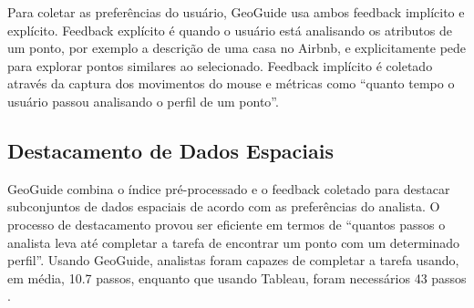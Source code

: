 Para coletar as preferências do usuário, GeoGuide usa ambos feedback implícito e explícito. Feedback explícito é quando o usuário está analisando os atributos de um ponto, por exemplo a descrição de uma casa no Airbnb, e explicitamente pede para explorar pontos similares ao selecionado. Feedback implícito é coletado através da captura dos movimentos do mouse e métricas como  ``quanto tempo o usuário passou analisando o perfil de um ponto''.

\subsection{Destacamento de Dados Espaciais}

GeoGuide combina o índice pré-processado e o feedback coletado para destacar subconjuntos de dados espaciais de acordo com as preferências do analista. O processo de destacamento provou ser eficiente em termos de ``quantos passos o analista leva até completar a tarefa de encontrar um ponto com um determinado perfil''. Usando GeoGuide, analistas foram capazes de completar a tarefa usando, em média, 10.7 passos, enquanto que usando Tableau, foram necessários 43 passos \cite{omidvarTehrani2017}.


